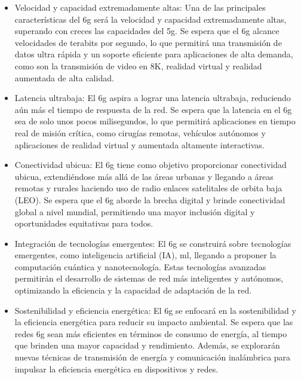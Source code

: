 \begin{itemize}

\item Velocidad y capacidad extremadamente altas: Una de las principales características del \gls{6g} será la velocidad y capacidad extremadamente altas, superando con creces las capacidades del \gls{5g}. Se espera que el \gls{6g} alcance velocidades de terabits por segundo, lo que permitirá una transmisión de datos ultra rápida y un soporte eficiente para aplicaciones de alta demanda, como son la transmisión de video en 8K, realidad virtual y realidad aumentada de alta calidad.

\item Latencia ultrabaja: El \gls{6g} aspira a lograr una latencia ultrabaja, reduciendo aún más el tiempo de respuesta de la red. Se espera que la latencia en el \gls{6g} sea de solo unos pocos milisegundos, lo que permitirá aplicaciones en tiempo real de misión crítica, como cirugías remotas, vehículos autónomos y aplicaciones de realidad virtual y aumentada altamente interactivas.

\item Conectividad ubicua: El \gls{6g} tiene como objetivo proporcionar conectividad ubicua, extendiéndose más allá de las áreas urbanas y llegando a áreas remotas y rurales haciendo uso de radio enlaces satelitales de orbita baja (LEO). Se espera que el \gls{6g} aborde la brecha digital y brinde conectividad global a nivel mundial, permitiendo una mayor inclusión digital y oportunidades equitativas para todos.

\item Integración de tecnologías emergentes: El \gls{6g} se construirá sobre tecnologías emergentes, como inteligencia artificial (IA), \gls{ml}, llegando a proponer la computación cuántica y nanotecnología. Estas tecnologías avanzadas permitirán el desarrollo de sistemas de red más inteligentes y autónomos, optimizando la eficiencia y la capacidad de adaptación de la red.

\item Sostenibilidad y eficiencia energética: El \gls{6g} se enfocará en la sostenibilidad y la eficiencia energética para reducir su impacto ambiental. Se espera que las redes \gls{6g} sean más eficientes en términos de consumo de energía, al tiempo que brinden una mayor capacidad y rendimiento. Además, se explorarán nuevas técnicas de transmisión de energía y comunicación inalámbrica para impulsar la eficiencia energética en dispositivos y redes.

\end{itemize}

